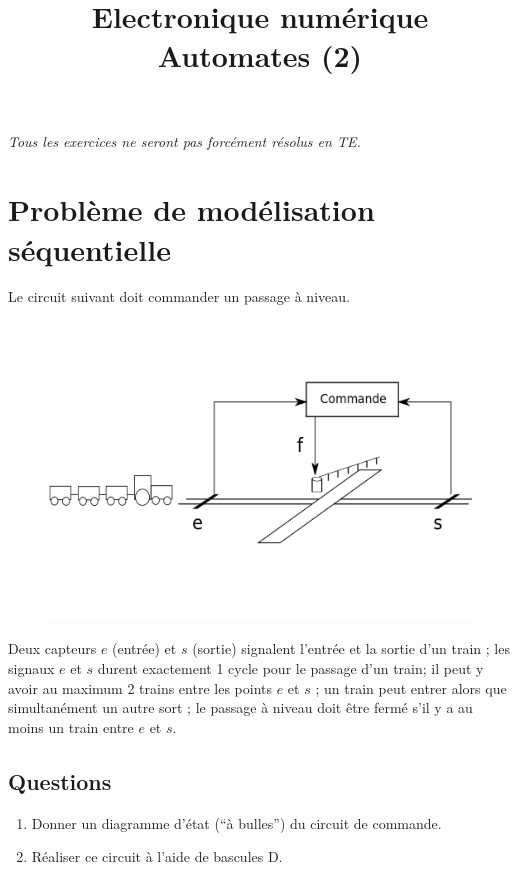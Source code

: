 \documentclass[a4paper,11pt]{article}
\title{{\Huge Electronique numérique}\\Automates (2)}
\date{}
\begin{document}
\maketitle
{\it Tous les exercices ne seront pas forcément résolus en TE.}

\section{Problème de modélisation séquentielle}
Le circuit suivant doit commander un passage à niveau.

\begin{figure}[!h]
\begin{center}
\includegraphics[scale=0.3]{./train.png}
\end{center}
\end{figure}

Deux capteurs $e$ (entrée) et $s$ (sortie) signalent l'entrée et la sortie d'un train ; les signaux $e$ et $s$ durent exactement 1 cycle pour le passage d'un train; il peut
y avoir au maximum 2 trains entre les points $e$ et $s$ ; un train peut entrer alors que simultanément un autre sort ; le passage à niveau doit être fermé s'il y a au moins un train entre
$e$ et $s$.

\subsection*{Questions}

\begin{enumerate}
\item Donner un diagramme d'état (``à bulles'') du circuit de commande.
\item Réaliser ce circuit à l'aide de bascules D.
\end{enumerate}
\end{document}
